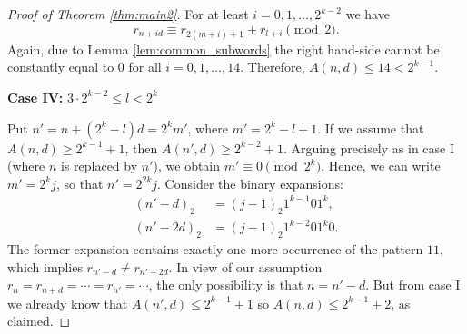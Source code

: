 \documentclass[a4paper,11pt]{amsart}
\theoremstyle{definition}
\begin{document}
\begin{proof}[Proof of Theorem \ref{thm:main2}]
For at least $i =0, 1, \ldots, 2^{k-2}$ we have 
$$r_{n+id} \equiv r_{2(m+i)+1} + r_{l+i} \pmod{2}.$$ 
Again, due to Lemma \ref{lem:common_subwords} the right hand-side cannot be constantly equal to $0$ for all  $i=0,1,\ldots,14$. Therefore, $A(n,d) \leq 14 < 2^{k-1}$.

\textbf{Case IV:} $3 \cdot 2^{k-2} \leq l < 2^{k}$

Put $n' = n+(2^{k} - l)d =  2^k m'$, where $m' = 2^{k} - l + 1$. If we assume that $A(n,d) \geq  2^{k-1} + 1$, then $A(n',d) \geq 2^{k-2} + 1$. Arguing precisely as in case I (where $n$ is replaced by $n'$), we obtain $m' \equiv 0 \pmod{2^k}$. Hence, we can write $m' = 2^{k} j$, so that $n' = 2^{2k} j$. Consider the binary expansions:
\begin{align*}
(n' - d)_2 &= (j-1)_2 1^{k-1} 0 1^k, \\
(n' - 2d)_2 &= (j-1)_2 1^{k-2} 0 1^k 0.
\end{align*}
The former expansion contains exactly one more occurrence of the pattern $11$, which implies $r_{n'-d} \neq r_{n'-2d}$. In view of our assumption $r_n = r_{n+d} = \cdots = r_{n'} = \cdots$, the only possibility is that $n = n'-d$. But from case I we already know that $A(n',d) \leq 2^{k-1} + 1$ so $A(n,d) \leq 2^{k-1} + 2$, as claimed.
\end{proof}
\end{document}
